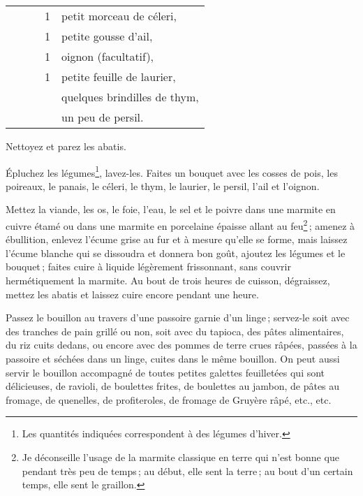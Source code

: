 \begin{longtable}{rrrrp{16em}}
  &       &         &  1 & petit morceau de céleri,                                                       \\
  &       &         &  1 & petite gousse d'ail,                                                           \\
  &       &         &  1 & oignon (facultatif),                                                           \\
  &       &         &  1 & petite feuille de laurier,                                                     \\
  &       &         &    & quelques brindilles de thym,                                                   \\
  &       &         &    & un peu de persil.                                                              \\
\end{longtable}
\normalsize

Nettoyez et parez les abatis.

Épluchez les légumes\footnote{Les quantités indiquées correspondent à des
légumes d'hiver.}, lavez-les. Faites un bouquet avec les cosses de pois, les
poireaux, le panais, le céleri, le thym, le laurier, le persil, l'ail et
l'oignon.

Mettez la viande, les os, le foie, l'eau, le sel et le poivre dans une marmite
en cuivre étamé ou dans une marmite en porcelaine épaisse allant au
feu\footnote{Je déconseille l'usage de la marmite classique en terre qui n'est
bonne que pendant très peu de temps ; au début, elle sent la terre ; au bout
d'un certain temps, elle sent le graillon.} ; amenez à ébullition, enlevez
l’écume grise au fur et à mesure qu'elle se forme, mais laissez l'écume blanche
qui se dissoudra et donnera bon goût, ajoutez les légumes et le bouquet ;
faites cuire à liquide légèrement frissonnant, sans couvrir hermétiquement la
marmite. Au bout de trois heures de cuisson, dégraissez, mettez les abatis et
laissez cuire encore pendant une heure.

Passez le bouillon au travers d'une passoire garnie d'un linge ; servez-le
soit avec des tranches de pain grillé ou non, soit avec du tapioca, des pâtes
alimentaires, du riz cuits dedans, ou encore avec des pommes de terre crues
râpées, passées à la passoire et séchées dans un linge, cuites dans le même
bouillon. On peut aussi servir le bouillon accompagné de toutes petites galettes
feuilletées qui sont délicieuses, de ravioli, de boulettes frites, de boulettes au
jambon, de pâtes au fromage, de quenelles, de profiteroles, de fromage de
Gruyère râpé, etc., etc.

